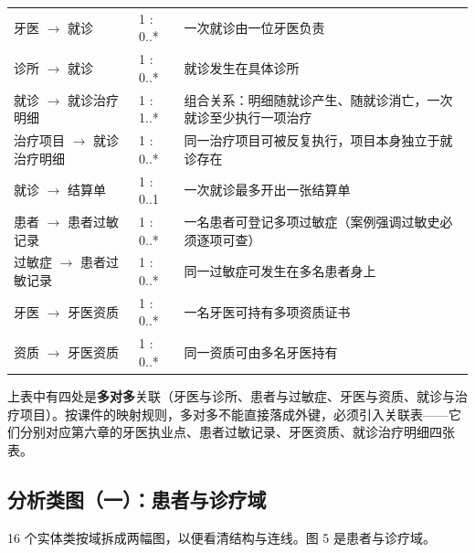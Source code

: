 \documentclass[11pt,a4paper]{ctexart}
\begin{document}
{\begin{longtable}{@{}L{5.2cm}L{1.8cm}L{8.3cm}@{}}
牙医 $\rightarrow$ 就诊 & 1 : 0..* & 一次就诊由一位牙医负责 \\
诊所 $\rightarrow$ 就诊 & 1 : 0..* & 就诊发生在具体诊所 \\
就诊 $\rightarrow$ 就诊治疗明细 & 1 : 1..* & 组合关系：明细随就诊产生、随就诊消亡，一次就诊至少执行一项治疗 \\
治疗项目 $\rightarrow$ 就诊治疗明细 & 1 : 0..* & 同一治疗项目可被反复执行，项目本身独立于就诊存在 \\
就诊 $\rightarrow$ 结算单 & 1 : 0..1 & 一次就诊最多开出一张结算单 \\
患者 $\rightarrow$ 患者过敏记录 & 1 : 0..* & 一名患者可登记多项过敏症（案例强调过敏史必须逐项可查） \\
过敏症 $\rightarrow$ 患者过敏记录 & 1 : 0..* & 同一过敏症可发生在多名患者身上 \\
牙医 $\rightarrow$ 牙医资质 & 1 : 0..* & 一名牙医可持有多项资质证书 \\
资质 $\rightarrow$ 牙医资质 & 1 : 0..* & 同一资质可由多名牙医持有 \\
\end{longtable}
}

上表中有四处是\textbf{多对多}关联（牙医与诊所、患者与过敏症、牙医与资质、就诊与治疗项目）。按课件的映射规则，多对多不能直接落成外键，必须引入关联表——它们分别对应第六章的牙医执业点、患者过敏记录、牙医资质、就诊治疗明细四张表。
\subsection{分析类图（一）：患者与诊疗域}

16 个实体类按域拆成两幅图，以便看清结构与连线。图 5 是患者与诊疗域。
\end{document}

